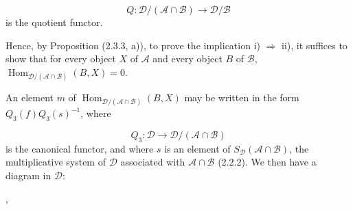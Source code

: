 \[
  Q\colon\mathcal D/(\mathcal A\cap\mathcal B)
  \longrightarrow\mathcal D/\mathcal B
\]
is the quotient functor.

Hence, by Proposition (2.3.3, a)), to prove the implication i)
$\Rightarrow$ ii), it suffices to show that for every object $X$ of
$\mathcal A$ and every object $B$ of $\mathcal B$,
$\operatorname{Hom}_{\mathcal D/(\mathcal A\cap\mathcal B)}(B,X)=0$.

An element $m$ of
$\operatorname{Hom}_{\mathcal D/(\mathcal A\cap\mathcal B)}(B,X)$ may be
written in the form $Q_3(f)Q_3(s)^{-1}$, where

\[
  Q_3\colon\mathcal D\longrightarrow
  \mathcal D/(\mathcal A\cap\mathcal B)
\]
is the canonical functor, and where $s$ is an element of
$S_{\mathcal D}(\mathcal A\cap\mathcal B)$, the multiplicative system of
$\mathcal D$ associated with $\mathcal A\cap\mathcal B$ (2.2.2). We then
have a diagram in $\mathcal D$:

\begin{center}
  \quad ,
\end{center}
\endgroup
